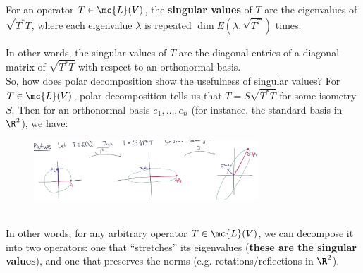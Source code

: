 \documentclass[math0540-lecture-notes.tex]{subfiles}
\begin{document}
\begin{definition}{}
  For an operator $T\in \mc{L}(V)$, the \textbf{singular values} of $T$ are the eigenvalues of
  $\sqrt{T^*T}$, where each eigenvalue $\lambda$ is repeated $\dim{E(\lambda,\sqrt{T^T})}$ times.
\end{definition}
In other words, the singular values of $T$ are the diagonal entries of a diagonal matrix of
$\sqrt{T^*T}$ with respect to an orthonormal basis.\\

So, how does polar decomposition show the usefulness of singular values? For $T\in \mc{L}(V)$, polar
decomposition tells us that $T=S\sqrt{T^*T}$ for some isometry $S$. Then for an orthonormal basis
$e_1,\ldots,e_n$ (for instance, the standard basis in $\R^2$), we have:
\begin{figure}[htpb]
  \centering
  \includegraphics[width=0.75\textwidth]{last_lec2.png}
\end{figure}
\\
In other words, for any arbitrary operator $T\in \mc{L}(V)$, we can decompose it into two operators:
one that ``stretches'' its eigenvalues (\textbf{these are the singular values}), and one that
preserves the norms (e.g. rotations/reflections in $\R^2$).\\
\end{document}
